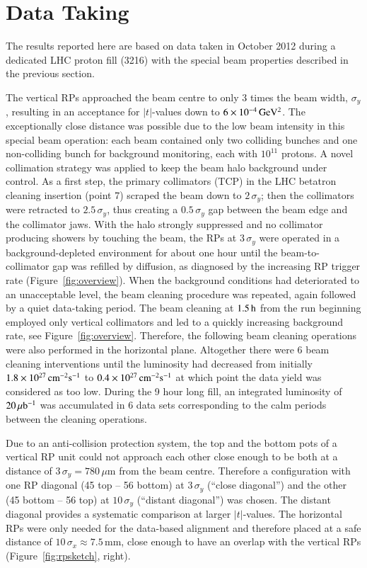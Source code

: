 \section{Data Taking}
\label{sec:data taking}

The results reported here are based on data taken in October 2012 
during a dedicated LHC proton fill (3216)
with the special beam properties described in the previous section.

The vertical RPs approached the beam centre to only 3 times the beam width, $\sigma_{y}$, resulting in an acceptance for $|t|$-values down to $6 \times 10^{-4}\,\rm GeV^{2}$. The exceptionally close distance was possible due to the low beam intensity in this special beam operation: each beam contained only two colliding bunches and one non-colliding bunch for background monitoring, each with $10^{11}$ protons. A novel collimation strategy was applied to keep the beam halo background under control. As a first step, the primary 
collimators (TCP) in the LHC betatron cleaning insertion (point 7) scraped the beam down to $2\,\sigma_{y}$; then the collimators were retracted to $2.5\,\sigma_{y}$, thus creating a $0.5\,\sigma_{y}$ gap between
the beam edge and the collimator jaws. With the halo strongly suppressed 
and no collimator producing showers by touching the beam, the RPs at 
$3\,\sigma_{y}$ were operated in a background-depleted environment for about one 
hour until the beam-to-collimator gap was refilled by diffusion, as 
diagnosed by the increasing RP trigger rate (Figure~\ref{fig:overview}). When the background conditions
had deteriorated to an unacceptable level, the beam cleaning procedure was repeated, again followed by a quiet data-taking period. The beam cleaning at $1.5\,{\rm h}$ from the run beginning employed only vertical collimators and led to a quickly increasing background rate, see Figure~\ref{fig:overview}. Therefore, the following beam cleaning operations were also performed in the horizontal plane. Altogether there were 6 beam cleaning interventions until the luminosity had decreased from initially $1.8\times10^{27}\,\rm cm^{-2}s^{-1}$ to 
$0.4\times10^{27}\,\rm cm^{-2}s^{-1}$
at which point the data yield was considered as too low. 
During the 9 hour long fill, an integrated luminosity of $20\,\rm \mu b^{-1}$ 
was accumulated in 6 data sets corresponding to the calm periods 
between the cleaning operations. 

Due to an anti-collision protection system, the top and the bottom pots of a 
vertical RP unit could not approach each other close enough to be both at a 
distance of $3\,\sigma_{y} = 780\,\mu$m from the beam centre. Therefore a 
configuration with one RP diagonal (45 top -- 56 bottom) at $3\,\sigma_{y}$ (``close diagonal'') and the other (45 bottom -- 56 top) at 
$10\,\sigma_{y}$ (``distant diagonal'') was chosen. The distant diagonal provides a systematic comparison at larger $|t|$-values.
The horizontal RPs were only needed for the data-based alignment and therefore placed at a safe distance of $10\,\sigma_{x} \approx 7.5$\,mm, close enough to have an overlap with the vertical RPs (Figure~\ref{fig:rpsketch}, right).

